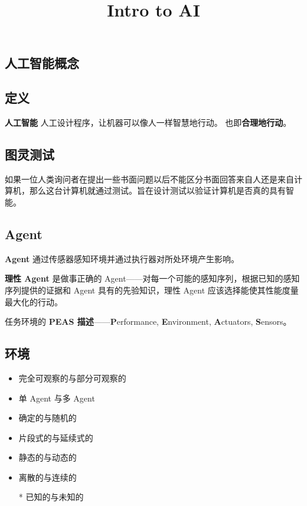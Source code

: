 \documentclass[10pt,a4paper]{ctexart}
\begin{document}
    \title{Intro to AI}
    \date{}
    \begin{multicols}{3}
        \maketitle

        \section{人工智能概念}
        \subsection{定义}
        \textbf{人工智能} 人工设计程序，让机器可以像人一样智慧地行动。
        也即\textbf{合理地行动}。
        \subsection{图灵测试}
        如果一位人类询问者在提出一些书面问题以后不能区分书面回答来自人还是来自计算机，那么这台计算机就通过测试。旨在设计测试以验证计算机是否真的具有智能。
        \subsection{Agent}
        \textbf{Agent} 通过传感器感知环境并通过执行器对所处环境产生影响。
        
        \textbf{理性 Agent} 是做事正确的 Agent------对每一个可能的感知序列，根据已知的感知序列提供的证据和 Agent 具有的先验知识，理性 Agent 应该选择能使其性能度量最大化的行动。
        
        任务环境的 \textbf{PEAS 描述}------\textbf{P}erformance, \textbf{E}nvironment, \textbf{A}ctuators, \textbf{S}ensors。

        \subsection{环境}
        \begin{itemize}
            \item 完全可观察的与部分可观察的
            \item 单 Agent 与多 Agent
            \item 确定的与随机的
            \item 片段式的与延续式的
            \item 静态的与动态的
            \item 离散的与连续的
            \item[*] 已知的与未知的
        \end{itemize}


\end{multicols}
\end{document}
